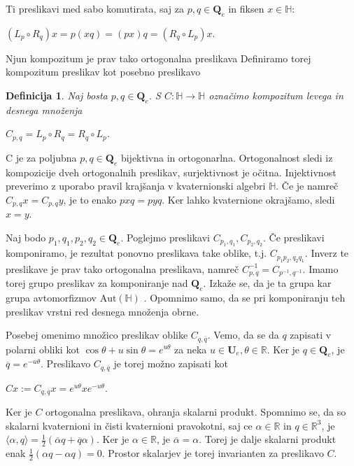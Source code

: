 \documentclass[a4paper,12pt]{article}
\def\R{\mathbb{R}} %
\def\H{\mathbb{H}} %
\def\Qe{\textbf{Q}_{e}} %
\def\Ue{\textbf{U}_{e}} %
\newcommand{\dotpr}[2]{\langle #1, #2 \rangle}
\newcommand{\conj}[1]{\overline{#1}}
\newtheorem{definicija}{Definicija}
\begin{document}
\newpage
Ti preslikavi med sabo komutirata, saj za $p,q \in \Qe$ in fiksen $x \in \H$:
\begin{center}
   $(L_{p} \circ R_{q})x = p(xq) = (px)q = (R_{q} \circ L_{p})x$.
\end{center}
Njun kompozitum je prav tako ortogonalna preslikava
Definiramo torej kompozitum preslikav kot posebno preslikavo
\begin{definicija}
Naj bosta $p,q \in \Qe$. S $C: \H \to \H$ označimo kompozitum levega in desnega množenja
\begin{center}
   $C_{p,q} = L_{p} \circ R_{q} = R_{q} \circ L_{p}$.
\end{center}
\end{definicija}
C je za poljubna $p,q \in \Qe$ bijektivna in ortogonarlna. Ortogonalnost sledi iz kompozicije dveh ortogonalnih preslikav,
surjektivnost je očitna. Injektivnost preverimo z uporabo pravil krajšanja v kvaternionski algebri $\H$.
Če je namreč $C_{p,q}x = C_{p,q}y$, je to enako $pxq = pyq$. Ker lahko kvaternione okrajšamo, sledi $x = y$.

Naj bodo $p_1, q_1, p_2, q_2 \in \Qe$. Poglejmo preslikavi $C_{p_1, q_1}, C_{p_2,q_2}$. Če preslikavi komponiramo, je rezultat ponovno preslikava take oblike, t.j.
$C_{p_1 p_2, q_2 q_1}$. Inverz te preslikave je prav tako ortogonalna preslikava, namreč $C^{-1}_{p,q} = C_{p^{-1}, q^{-1}}.$ 
Imamo torej grupo preslikav za komponiranje nad $\Qe$. Izkaže se, da je ta grupa kar grupa avtomorfizmov $\text{Aut} ( \H )$ \cite{brevsar2018skolem}.
Opomnimo samo, da se pri komponiranju teh preslikav vrstni red desnega množenja obrne.

Posebej omenimo množico preslikav oblike $C_{q,\conj{q}}$. Vemo, da se da $q$ zapisati v polarni obliki kot
$\cos\theta + u\sin\theta = e^{u\theta}$ za neka $u \in \Ue, \theta \in \R$. Ker je $q \in \Qe$, je $\conj{q} = e^{-u\theta}$.
Preslikavo $C_{q, \conj{q}}$ je torej možno zapisati kot
\begin{center}
   $Cx := C_{q, \conj{q}} x = e^{u\theta}x e^{-u\theta}$.
\end{center}
Ker je $C$ ortogonalna preslikava, ohranja skalarni produkt. Spomnimo se, da so skalarni kvaternioni in čisti kvaternioni pravokotni,
saj ce $\alpha \in \R$ in $q \in \R^3$, je $\dotpr{\alpha}{q} = \frac{1}{2} (\conj{\alpha}q + \conj{q}\alpha)$. Ker je $\alpha \in \R$, je $\conj{\alpha} = \alpha$.
Torej je dalje skalarni produkt enak $\frac{1}{2}(\alpha q - \alpha q) = 0$. Prostor skalarjev je torej invarianten za preslikavo $C$.
\end{document}
